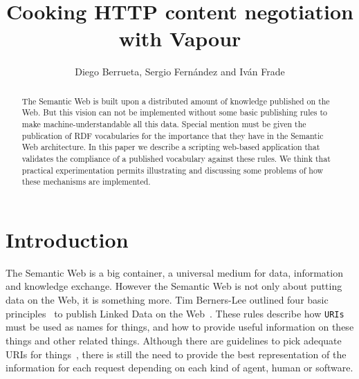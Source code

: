 \documentclass{../templates/llncs}
\begin{document}
\title{Cooking HTTP content negotiation with Vapour} %

\author{Diego Berrueta, Sergio Fern\'andez and Iv\'an Frade}


\maketitle

\begin{abstract}
The Semantic Web is built upon a distributed amount of knowledge published on 
the Web. But this vision can not be implemented without some basic publishing
rules to make machine-understandable all this data. Special mention must be 
given the publication of RDF vocabularies for the importance that they have 
in the Semantic Web architecture. In this paper we describe a scripting 
web-based application that validates the compliance of a published vocabulary 
against these rules. We think that practical experimentation permits 
illustrating and discussing some problems of how these mechanisms are
implemented.
\end{abstract}

\section{Introduction}

The Semantic Web is a big container, a universal medium for data, information
and knowledge exchange. However the Semantic Web is not only about putting data on
the Web, it is something more. Tim Berners-Lee outlined four basic 
principles~\cite{TimBL2006} to publish Linked Data on the Web~\cite{PublishLinkedData2007}.
These rules describe how \texttt{URIs} must be used as names for things, 
and how to provide useful information on these things and other related 
things. Although there are guidelines to pick adequate URIs for 
things~\cite{Sauermann2007}, there is still the need to provide the best 
representation of the information for each request depending on each kind 
of agent, human or software.
\end{document}
